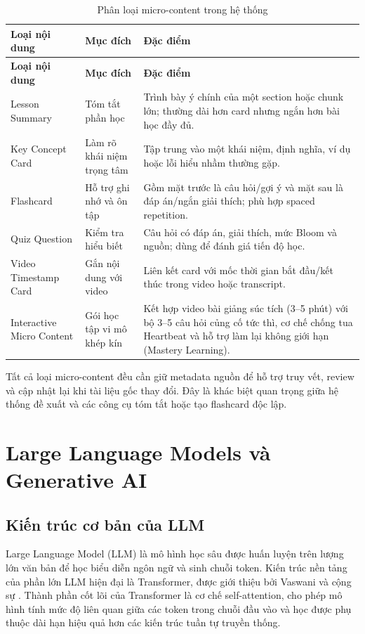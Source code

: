 \begin{longtable}{|p{3cm}|p{4.2cm}|p{6.8cm}|}
\caption{Phân loại micro-content trong hệ thống}
\label{tab:micro-content-types}\\
\hline
\textbf{Loại nội dung} & \textbf{Mục đích} & \textbf{Đặc điểm} \\
\hline
\endfirsthead
\hline
\textbf{Loại nội dung} & \textbf{Mục đích} & \textbf{Đặc điểm} \\
\hline
\endhead
Lesson Summary & Tóm tắt phần học & Trình bày ý chính của một section hoặc chunk lớn; thường dài hơn card nhưng ngắn hơn bài học đầy đủ. \\
\hline
Key Concept Card & Làm rõ khái niệm trọng tâm & Tập trung vào một khái niệm, định nghĩa, ví dụ hoặc lỗi hiểu nhầm thường gặp. \\
\hline
Flashcard & Hỗ trợ ghi nhớ và ôn tập & Gồm mặt trước là câu hỏi/gợi ý và mặt sau là đáp án/ngắn giải thích; phù hợp spaced repetition. \\
\hline
Quiz Question & Kiểm tra hiểu biết & Câu hỏi có đáp án, giải thích, mức Bloom và nguồn; dùng để đánh giá tiến độ học. \\
\hline
Video Timestamp Card & Gắn nội dung với video & Liên kết card với mốc thời gian bắt đầu/kết thúc trong video hoặc transcript. \\
\hline
Interactive Micro Content & Gói học tập vi mô khép kín & Kết hợp video bài giảng súc tích (3--5 phút) với bộ 3--5 câu hỏi củng cố tức thì, cơ chế chống tua Heartbeat và hỗ trợ làm lại không giới hạn (Mastery Learning). \\
\hline
\end{longtable}

Tất cả loại micro-content đều cần giữ metadata nguồn để hỗ trợ truy vết, review
và cập nhật lại khi tài liệu gốc thay đổi. Đây là khác biệt quan trọng giữa hệ
thống đề xuất và các công cụ tóm tắt hoặc tạo flashcard độc lập.

\section{Large Language Models và Generative AI}
\label{sec:llm-generative-ai}

\subsection{Kiến trúc cơ bản của LLM}
\label{subsec:kien-truc-llm}

Large Language Model (LLM) là mô hình học sâu được huấn luyện trên lượng lớn
văn bản để học biểu diễn ngôn ngữ và sinh chuỗi token. Kiến trúc nền tảng của
phần lớn LLM hiện đại là Transformer, được giới thiệu bởi Vaswani và cộng sự
\cite{vaswani2017attention}. Thành phần cốt lõi của Transformer là cơ chế
self-attention, cho phép mô hình tính mức độ liên quan giữa các token trong
chuỗi đầu vào và học được phụ thuộc dài hạn hiệu quả hơn các kiến trúc tuần tự
truyền thống.

